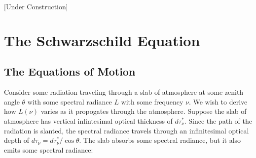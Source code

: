 [Under Construction]

\chapter{The Schwarzschild Equation}

\section{The Equations of Motion}

Consider some radiation traveling through a slab of atmosphere at some zenith angle $\theta$ with some spectral radiance $L$ with some frequency $\nu$. We wish to derive how $L(\nu)$ varies as it propogates through the atmosphere. Suppose the slab of atmosphere has vertical infintesimal optical thickness of $d\tau_\nu^*$. Since the path of the radiation is slanted, the spectral radiance travels through an infinitesimal optical depth of $d\tau_\nu=d\tau_\nu^*/\cos\theta$. The slab absorbs some spectral radiance, but it also emits some spectral radiance:

\begin{figure}[H]
    \centering
\end{figure}

